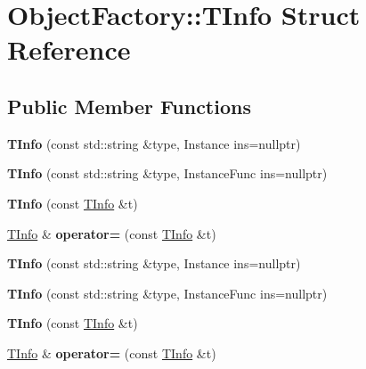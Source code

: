 \hypertarget{structObjectFactory_1_1TInfo}{}\section{Object\+Factory\+:\+:T\+Info Struct Reference}
\label{structObjectFactory_1_1TInfo}
\subsection*{Public Member Functions}
\begin{DoxyCompactItemize}
\item 
\mbox{\label{structObjectFactory_1_1TInfo_a634e35505ecd7ea9d07495560eaf82d6}} 
{\bfseries T\+Info} (const std\+::string \&type, Instance ins=nullptr)
\item 
\mbox{\label{structObjectFactory_1_1TInfo_a9e9d434c1e84778a3f9fbd898af13171}} 
{\bfseries T\+Info} (const std\+::string \&type, Instance\+Func ins=nullptr)
\item 
\mbox{\label{structObjectFactory_1_1TInfo_a5e130380c9fcc61799ff0b673a6bab0d}} 
{\bfseries T\+Info} (const \hyperlink{structObjectFactory_1_1TInfo}{T\+Info} \&t)
\item 
\mbox{\label{structObjectFactory_1_1TInfo_a127360d2a0896e4d542bb8136534eec2}} 
\hyperlink{structObjectFactory_1_1TInfo}{T\+Info} \& {\bfseries operator=} (const \hyperlink{structObjectFactory_1_1TInfo}{T\+Info} \&t)
\item 
\mbox{\label{structObjectFactory_1_1TInfo_a634e35505ecd7ea9d07495560eaf82d6}} 
{\bfseries T\+Info} (const std\+::string \&type, Instance ins=nullptr)
\item 
\mbox{\label{structObjectFactory_1_1TInfo_a9e9d434c1e84778a3f9fbd898af13171}} 
{\bfseries T\+Info} (const std\+::string \&type, Instance\+Func ins=nullptr)
\item 
\mbox{\label{structObjectFactory_1_1TInfo_a5e130380c9fcc61799ff0b673a6bab0d}} 
{\bfseries T\+Info} (const \hyperlink{structObjectFactory_1_1TInfo}{T\+Info} \&t)
\item 
\mbox{\label{structObjectFactory_1_1TInfo_ad58580bce372fe0299ec100b6cebb7f3}} 
\hyperlink{structObjectFactory_1_1TInfo}{T\+Info} \& {\bfseries operator=} (const \hyperlink{structObjectFactory_1_1TInfo}{T\+Info} \&t)
\end{DoxyCompactItemize}
